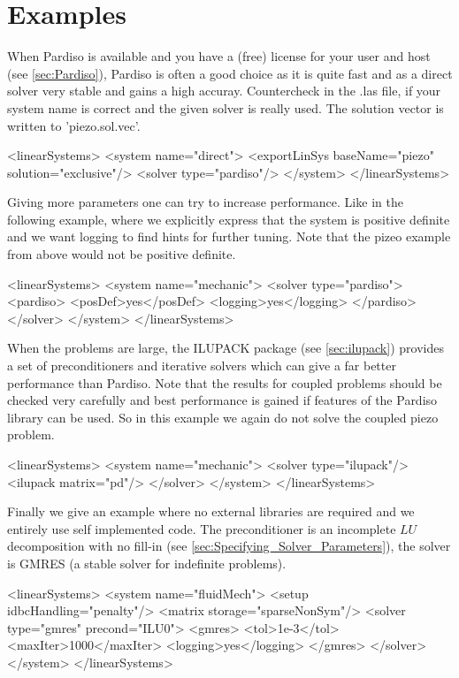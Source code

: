 \section{Examples}
\label{sec:SP_Examples}
When Pardiso is available and you have a (free) license for your user and host
(see \ref{sec:Pardiso}), Pardiso is often a good choice as it is quite fast and
as a direct solver very stable and gains a high accuray. Countercheck in the
.las file, if your system name is correct and the given solver is really used.
The solution vector is written to 'piezo.sol.vec'. 
\begin{xmllisting}
<linearSystems>
  <system name="direct">
    <exportLinSys baseName="piezo" solution="exclusive"/>
    <solver type="pardiso"/>
  </system>
</linearSystems>
\end{xmllisting}
Giving more parameters one can try to increase performance. Like in the
following example, where we explicitly express that the system is positive
definite and we want logging to find hints for further tuning. Note that the
pizeo example from above would not be positive definite.
\begin{xmllisting}
<linearSystems>
  <system name="mechanic">
    <solver type="pardiso">
      <pardiso>
        <posDef>yes</posDef>
        <logging>yes</logging>
      </pardiso>
     </solver>
  </system>
</linearSystems>
\end{xmllisting}


When the problems are large, the ILUPACK package (see \ref{sec:ilupack})
provides a set of preconditioners and iterative solvers which can give a far
better performance than Pardiso. Note that the results for coupled problems
should be checked very carefully and best performance is gained if features of
the Pardiso library can be used. So in this example we again do not solve the
coupled piezo problem.
\begin{xmllisting}
<linearSystems>
  <system name="mechanic">
    <solver type="ilupack"/>
      <ilupack matrix="pd"/>
    </solver>
  </system>
</linearSystems>
\end{xmllisting}


Finally we give an example where no external libraries are required and we
entirely use self implemented code. The preconditioner is an incomplete $LU$
decomposition with no fill-in (see \ref{sec:Specifying_Solver_Parameters}), the
solver is GMRES (a stable solver for indefinite problems).
\begin{xmllisting}
<linearSystems>
  <system name="fluidMech">
    <setup idbcHandling="penalty"/>
    <matrix storage="sparseNonSym"/>
    <solver type="gmres" precond="ILU0">
      <gmres>
        <tol>1e-3</tol>
        <maxIter>1000</maxIter>
        <logging>yes</logging>
      </gmres>
    </solver>
  </system>
</linearSystems>
\end{xmllisting}

